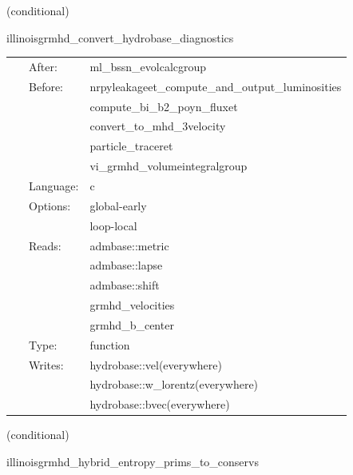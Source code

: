 \documentclass{article}
\begin{document}
\vspace{5mm}

   (conditional) 

\hspace{5mm} illinoisgrmhd\_convert\_hydrobase\_diagnostics 

\hspace{5mm}{\it convert illinoisgrmhd-native variables to hydrobase } 


\hspace{5mm}

 \begin{tabular*}{160mm}{cll} 
~ & After:  & ml\_bssn\_evolcalcgroup \\ 
~ & Before:  & nrpyleakageet\_compute\_and\_output\_luminosities \\ 
~& ~ &compute\_bi\_b2\_poyn\_fluxet\\ 
~& ~ &convert\_to\_mhd\_3velocity\\ 
~& ~ &particle\_traceret\\ 
~& ~ &vi\_grmhd\_volumeintegralgroup\\ 
~ & Language:  & c \\ 
~ & Options:  & global-early \\ 
~& ~ &loop-local\\ 
~ & Reads:  & admbase::metric \\ 
~& ~ &admbase::lapse\\ 
~& ~ &admbase::shift\\ 
~& ~ &grmhd\_velocities\\ 
~& ~ &grmhd\_b\_center\\ 
~ & Type:  & function \\ 
~ & Writes:  & hydrobase::vel(everywhere) \\ 
~& ~ &hydrobase::w\_lorentz(everywhere)\\ 
~& ~ &hydrobase::bvec(everywhere)\\ 
\end{tabular*} 


\vspace{5mm}

   (conditional) 

\hspace{5mm} illinoisgrmhd\_hybrid\_entropy\_prims\_to\_conservs 

\hspace{5mm}{\it entropy+hybrid version of illinoisgrmhd\_prims\_to\_conservs } 


\hspace{5mm}
\end{document}
